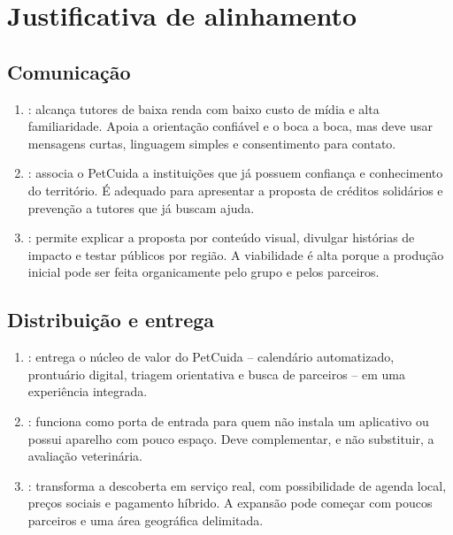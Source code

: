 \section{Justificativa de alinhamento}
\label{sec:justificativa}

\subsection{Comunicação}
\begin{enumerate}
\item {}: alcança tutores de baixa renda com baixo custo de mídia e alta familiaridade. Apoia a orientação confiável e o boca a boca, mas deve usar mensagens curtas, linguagem simples e consentimento para contato.
\item {}: associa o PetCuida a instituições que já possuem confiança e conhecimento do território. É adequado para apresentar a proposta de créditos solidários e prevenção a tutores que já buscam ajuda.
\item {}: permite explicar a proposta por conteúdo visual, divulgar histórias de impacto e testar públicos por região. A viabilidade é alta porque a produção inicial pode ser feita organicamente pelo grupo e pelos parceiros.
\end{enumerate}

\subsection{Distribuição e entrega}
\begin{enumerate}
\item {}: entrega o núcleo de valor do PetCuida -- calendário automatizado, prontuário digital, triagem orientativa e busca de parceiros -- em uma experiência integrada.
\item {}: funciona como porta de entrada para quem não instala um aplicativo ou possui aparelho com pouco espaço. Deve complementar, e não substituir, a avaliação veterinária.
\item {}: transforma a descoberta em serviço real, com possibilidade de agenda local, preços sociais e pagamento híbrido. A expansão pode começar com poucos parceiros e uma área geográfica delimitada.
\end{enumerate}

